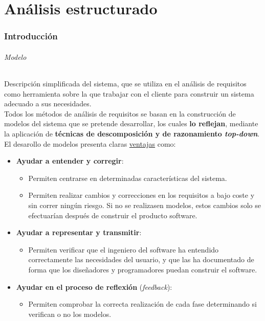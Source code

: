 \part{Análisis estructurado}

\section{Introducción}

\paragraph{Modelo} Descripción simplificada del sistema, que se utiliza en el análisis de requisitos como herramienta sobre la que trabajar con el cliente para construir un sistema adecuado a sus necesidades.\\

Todos los métodos de análisis de requisitos se basan en la construcción de modelos del sistema que se pretende desarrollar, los cuales \textbf{lo reflejan}, mediante la aplicación de \textbf{técnicas de descomposición y de razonamiento \textit{top-down}}. El desarollo de modelos presenta claras \uline{ventajas} como:

\begin{itemize}
    \item \textbf{Ayudar a entender y corregir}:
    \begin{itemize}
        \item Permiten centrarse en determinadas características del sistema.
        \item Permiten realizar cambios y correcciones en los requisitos a bajo coste y sin correr ningún riesgo. Si no se realizasen modelos, estos cambios solo se efectuarían después de construir el producto software.
    \end{itemize}
    \item \textbf{Ayudar a representar y transmitir}:
    \begin{itemize}
        \item Permiten verificar que el ingeniero del software ha entendido correctamente las necesidades del usuario, y que las ha documentado de forma que los diseñadores y programadores puedan construir el software.
    \end{itemize}
    \item \textbf{Ayudar en el proceso de reflexión} (\textit{feedback}):
    \begin{itemize}
        \item Permiten comprobar la correcta realización de cada fase determinando si verifican o no los modelos.
    \end{itemize}
\end{itemize}

